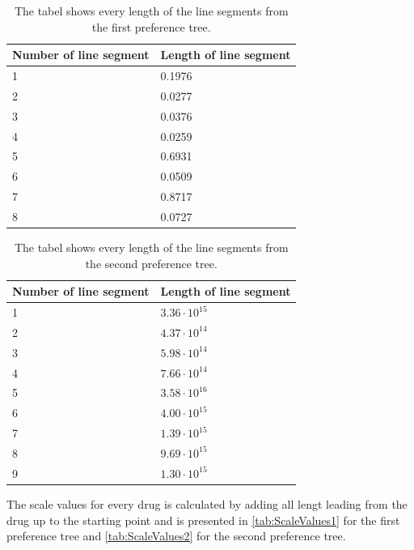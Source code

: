 %
\begin{table}[H]
	\centering
	\begin{tabular}{@{}ll@{}}
		\toprule
		Number of line segment    & Length of line segment \\ \midrule
		1									      & 0.1976   \\
		2      									  & 0.0277   \\
		3      									  & 0.0376   \\
		4      									  & 0.0259   \\
		5      									  & 0.6931   \\
		6      									  & 0.0509   \\
		7      									  & 0.8717   \\
		8								          & 0.0727   \\ \bottomrule
	\end{tabular}
	\caption{The tabel shows every length of the line segments from the first preference tree.}
	\label{tab:Length1}
\end{table} 
\noindent 
% 
\begin{table}[H]
	\centering
	\begin{tabular}{@{}ll@{}}
		\toprule
		Number of line segment     & Length of line segment \\ \midrule
		1							      & $3.36\cdot10^{15}$   \\
		2      							  & $4.37\cdot10^{14}$   \\
		3      							  & $5.98\cdot10^{14}$   \\
		4      							  & $7.66\cdot10^{14}$   \\
		5      							  & $3.58\cdot10^{16}$   \\
		6     							  & $4.00\cdot10^{15}$   \\
		7      							  & $1.39\cdot10^{15}$   \\
		8						          & $9.69\cdot10^{15}$   \\
		9								  & $1.30\cdot10^{15}$   \\ \bottomrule
	\end{tabular}
	\caption{The tabel shows every length of the line segments from the second preference tree.}
	\label{tab:Length2}
\end{table} 
\noindent 
%
The scale values for every drug is calculated by adding all lengt leading from the drug up to the starting point and is presented in \autoref{tab:ScaleValues1} for the first preference tree and \autoref{tab:ScaleValues2} for the second preference tree.\blankline
